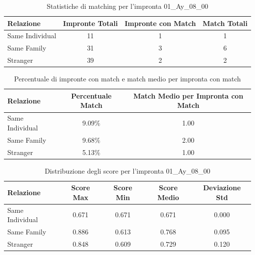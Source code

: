 \begin{table}[htbp]
\centering
\caption{Statistiche di matching per l'impronta 01\_Ay\_08\_00}
\label{tab:results_01_Ay_08_00}
\begin{tabular}{|l|c|c|c|}
\hline
\textbf{Relazione} & \textbf{Impronte Totali} & \textbf{Impronte con Match} & \textbf{Match Totali} \\
\hline
Same Individual & 11 & 1 & 1 \\
\hline
Same Family & 31 & 3 & 6 \\
\hline
Stranger & 39 & 2 & 2 \\
\hline
\end{tabular}
\end{table}


\begin{table}[htbp]
\centering
\caption{Percentuale di impronte con match e match medio per impronta con match}
\label{tab:match_percentage_01_Ay_08_00}
\begin{tabular}{|l|c|c|}
\hline
\textbf{Relazione} & \textbf{Percentuale Match} & \textbf{Match Medio per Impronta con Match} \\
\hline
Same Individual & 9.09\% & 1.00 \\
\hline
Same Family & 9.68\% & 2.00 \\
\hline
Stranger & 5.13\% & 1.00 \\
\hline
\end{tabular}
\end{table}


\begin{table}[htbp]
\centering
\caption{Distribuzione degli score per l'impronta 01\_Ay\_08\_00}
\label{tab:scores_01_Ay_08_00}
\begin{tabular}{|l|c|c|c|c|}
\hline
\textbf{Relazione} & \textbf{Score Max} & \textbf{Score Min} & \textbf{Score Medio} & \textbf{Deviazione Std} \\
\hline
Same Individual & 0.671 & 0.671 & 0.671 & 0.000 \\
\hline
Same Family & 0.886 & 0.613 & 0.768 & 0.095 \\
\hline
Stranger & 0.848 & 0.609 & 0.729 & 0.120 \\
\hline
\end{tabular}
\end{table}

